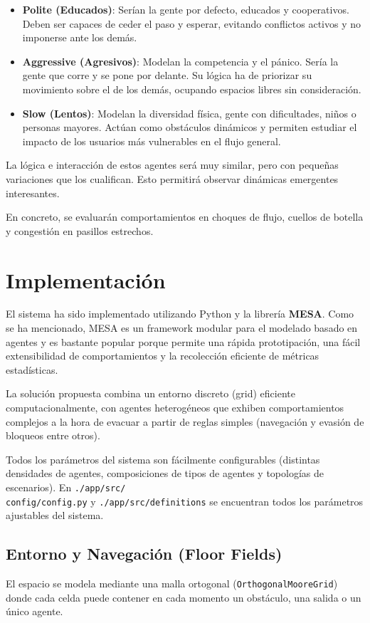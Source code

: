 \documentclass[11pt,spanish,listoffigures,listoftables]{tfgetsinf}
\begin{document}
\begin{itemize}
    \item \textbf{Polite (Educados)}: Serían la gente por defecto, educados y cooperativos. Deben ser capaces de ceder el paso y esperar, evitando conflictos activos y no imponerse ante los demás.
    \item \textbf{Aggressive (Agresivos)}: Modelan la competencia y el pánico. Sería la gente que corre y se pone por delante. Su lógica ha de priorizar su movimiento sobre el de los demás, ocupando espacios libres sin consideración.
    \item \textbf{Slow (Lentos)}: Modelan la diversidad física, gente con dificultades, niños o personas mayores. Actúan como obstáculos dinámicos y permiten estudiar el impacto de los usuarios más vulnerables en el flujo general.
\end{itemize}

La lógica e interacción de estos agentes será muy similar, pero con pequeñas variaciones que los cualifican. Esto permitirá observar dinámicas emergentes interesantes. 

\noindent En concreto, se evaluarán comportamientos en choques de flujo, cuellos de botella y congestión en pasillos estrechos.

\chapter{Implementación}

El sistema ha sido implementado utilizando Python y la librería \textbf{MESA}. Como se ha mencionado, MESA es un framework modular para el modelado basado en agentes y es bastante popular porque permite una rápida prototipación, una fácil extensibilidad de comportamientos y la recolección eficiente de métricas estadísticas.

La solución propuesta combina un entorno discreto (grid) eficiente computacionalmente, con agentes heterogéneos que exhiben comportamientos complejos a la hora de evacuar a partir de reglas simples (navegación y evasión de bloqueos entre otros).

Todos los parámetros del sistema son fácilmente configurables (distintas densidades de agentes, composiciones de tipos de agentes y topologías de escenarios). En \texttt{./app/src/\\config/config.py} y \texttt{./app/src/definitions} se encuentran todos los parámetros ajustables del sistema.

\section{Entorno y Navegación (Floor Fields)}
El espacio se modela mediante una malla ortogonal (\texttt{OrthogonalMooreGrid}) donde cada celda puede contener en cada momento un obstáculo, una salida o un único agente.
\end{document}
